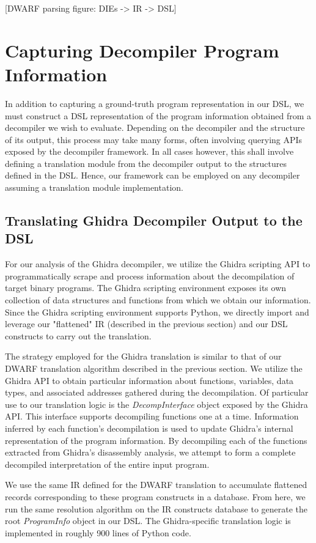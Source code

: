 [DWARF parsing figure: DIEs -> IR -> DSL]

\section{Capturing Decompiler Program Information}

In addition to capturing a ground-truth program representation in our DSL, we must construct a DSL representation of the program information obtained from a decompiler we wish to evaluate. Depending on the decompiler and the structure of its output, this process may take many forms, often involving querying APIs exposed by the decompiler framework. In all cases however, this shall involve defining a translation module from the decompiler output to the structures defined in the DSL. Hence, our framework can be employed on any decompiler assuming a translation module implementation.

\subsection{Translating Ghidra Decompiler Output to the DSL}

For our analysis of the Ghidra decompiler, we utilize the Ghidra scripting API to programmatically scrape and process information about the decompilation of target binary programs. The Ghidra scripting environment exposes its own collection of data structures and functions from which we obtain our information. Since the Ghidra scripting environment supports Python, we directly import and leverage our "flattened" IR (described in the previous section) and our DSL constructs to carry out the translation.

The strategy employed for the Ghidra translation is similar to that of our DWARF translation algorithm described in the previous section. We utilize the Ghidra API to obtain particular information about functions, variables, data types, and associated addresses gathered during the decompilation. Of particular use to our translation logic is the \emph{DecompInterface} object exposed by the Ghidra API. This interface supports decompiling functions one at a time. Information inferred by each function's decompilation is used to update Ghidra's internal representation of the program information. By decompiling each of the functions extracted from Ghidra's disassembly analysis, we attempt to form a complete decompiled interpretation of the entire input program.

We use the same IR defined for the DWARF translation to accumulate flattened records corresponding to these program constructs in a database. From here, we run the same resolution algorithm on the IR constructs database to generate the root \emph{ProgramInfo} object in our DSL. The Ghidra-specific translation logic is implemented in roughly 900 lines of Python code.

